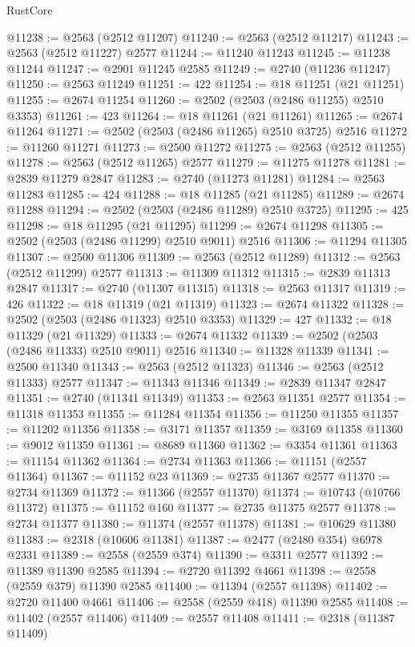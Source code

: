 \begin{lexlean}{RustCore}
\begin{coremodule}
@11238 := @2563 (@2512 @11207)
@11240 := @2563 (@2512 @11217)
@11243 := @2563 (@2512 @11227) @2577
@11244 := @11240 @11243
@11245 := @11238 @11244
@11247 := @2901 @11245 @2585
@11249 := @2740 (@11236 @11247)
@11250 := @2563 @11249
@11251 := 422
@11254 := @18 @11251 (@21 @11251)
@11255 := @2674 @11254
@11260 := @2502 (@2503 (@2486 @11255) @2510 @3353)
@11261 := 423
@11264 := @18 @11261 (@21 @11261)
@11265 := @2674 @11264
@11271 := @2502 (@2503 (@2486 @11265) @2510 @3725) @2516
@11272 := @11260 @11271
@11273 := @2500 @11272
@11275 := @2563 (@2512 @11255)
@11278 := @2563 (@2512 @11265) @2577
@11279 := @11275 @11278
@11281 := @2839 @11279 @2847
@11283 := @2740 (@11273 @11281)
@11284 := @2563 @11283
@11285 := 424
@11288 := @18 @11285 (@21 @11285)
@11289 := @2674 @11288
@11294 := @2502 (@2503 (@2486 @11289) @2510 @3725)
@11295 := 425
@11298 := @18 @11295 (@21 @11295)
@11299 := @2674 @11298
@11305 := @2502 (@2503 (@2486 @11299) @2510 @9011) @2516
@11306 := @11294 @11305
@11307 := @2500 @11306
@11309 := @2563 (@2512 @11289)
@11312 := @2563 (@2512 @11299) @2577
@11313 := @11309 @11312
@11315 := @2839 @11313 @2847
@11317 := @2740 (@11307 @11315)
@11318 := @2563 @11317
@11319 := 426
@11322 := @18 @11319 (@21 @11319)
@11323 := @2674 @11322
@11328 := @2502 (@2503 (@2486 @11323) @2510 @3353)
@11329 := 427
@11332 := @18 @11329 (@21 @11329)
@11333 := @2674 @11332
@11339 := @2502 (@2503 (@2486 @11333) @2510 @9011) @2516
@11340 := @11328 @11339
@11341 := @2500 @11340
@11343 := @2563 (@2512 @11323)
@11346 := @2563 (@2512 @11333) @2577
@11347 := @11343 @11346
@11349 := @2839 @11347 @2847
@11351 := @2740 (@11341 @11349)
@11353 := @2563 @11351 @2577
@11354 := @11318 @11353
@11355 := @11284 @11354
@11356 := @11250 @11355
@11357 := @11202 @11356
@11358 := @3171 @11357
@11359 := @3169 @11358
@11360 := @9012 @11359
@11361 := @8689 @11360
@11362 := @3354 @11361
@11363 := @11154 @11362
@11364 := @2734 @11363
@11366 := @11151 (@2557 @11364)
@11367 := @11152 @23
@11369 := @2735 @11367 @2577
@11370 := @2734 @11369
@11372 := @11366 (@2557 @11370)
@11374 := @10743 (@10766 @11372)
@11375 := @11152 @160
@11377 := @2735 @11375 @2577
@11378 := @2734 @11377
@11380 := @11374 (@2557 @11378)
@11381 := @10629 @11380
@11383 := @2318 (@10606 @11381)
@11387 := @2477 (@2480 @354) @6978 @2331
@11389 := @2558 (@2559 @374)
@11390 := @3311 @2577
@11392 := @11389 @11390 @2585
@11394 := @2720 @11392 @4661
@11398 := @2558 (@2559 @379) @11390 @2585
@11400 := @11394 (@2557 @11398)
@11402 := @2720 @11400 @4661
@11406 := @2558 (@2559 @418) @11390 @2585
@11408 := @11402 (@2557 @11406)
@11409 := @2557 @11408
@11411 := @2318 (@11387 @11409)

\end{coremodule}
\end{lexlean}
